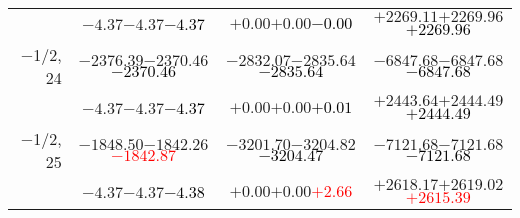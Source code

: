 \documentclass[compress]{beamer}
\begin{document}
\begin{frame}
{\begin{tabular}{r | c | c | c}
           & $-4.37$\hspace{0.1 cm}$-4.37$\hspace{0.1 cm}\textcolor{black}{$-4.37$} & $+0.00$\hspace{0.1 cm}$+0.00$\hspace{0.1 cm}\textcolor{black}{$-0.00$} & $+2269.11$\hspace{0.1 cm}$+2269.96$\hspace{0.1 cm}\textcolor{black}{$+2269.96$} \\
$-$1/2, 24 & $-2376.39$\hspace{0.1 cm}$-2370.46$\hspace{0.1 cm}\textcolor{black}{$-2370.46$} & $-2832.07$\hspace{0.1 cm}$-2835.64$\hspace{0.1 cm}\textcolor{black}{$-2835.64$} & $-6847.68$\hspace{0.1 cm}$-6847.68$\hspace{0.1 cm}\textcolor{black}{$-6847.68$} \\
           & $-4.37$\hspace{0.1 cm}$-4.37$\hspace{0.1 cm}\textcolor{black}{$-4.37$} & $+0.00$\hspace{0.1 cm}$+0.00$\hspace{0.1 cm}\textcolor{black}{$+0.01$} & $+2443.64$\hspace{0.1 cm}$+2444.49$\hspace{0.1 cm}\textcolor{black}{$+2444.49$} \\
$-$1/2, 25 & $-1848.50$\hspace{0.1 cm}$-1842.26$\hspace{0.1 cm}\textcolor{red}{$-1842.87$} & $-3201.70$\hspace{0.1 cm}$-3204.82$\hspace{0.1 cm}\textcolor{black}{$-3204.47$} & $-7121.68$\hspace{0.1 cm}$-7121.68$\hspace{0.1 cm}\textcolor{black}{$-7121.68$} \\
           & $-4.37$\hspace{0.1 cm}$-4.37$\hspace{0.1 cm}\textcolor{black}{$-4.38$} & $+0.00$\hspace{0.1 cm}$+0.00$\hspace{0.1 cm}\textcolor{red}{$+2.66$} & $+2618.17$\hspace{0.1 cm}$+2619.02$\hspace{0.1 cm}\textcolor{red}{$+2615.39$} \\

\end{tabular}}
\end{frame}
\end{document}
